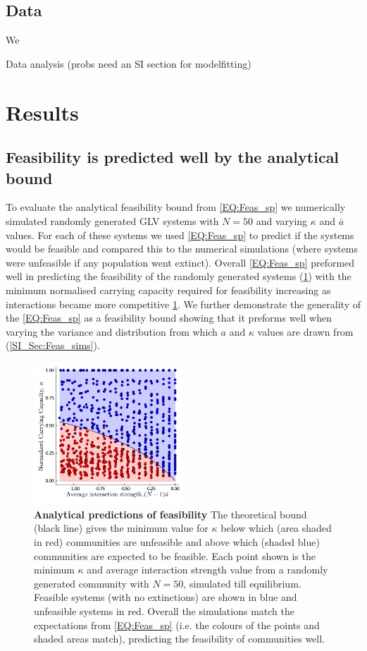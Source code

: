 \documentclass{article}
\begin{document}
\subsection{Data}
We 

Data analysis (probs need an SI section for modelfitting)

\section{Results}

\subsection{Feasibility is predicted well by the analytical bound}

To evaluate the analytical feasibility bound from \cref{EQ:Feas_sp} we numerically simulated randomly generated GLV systems with $N = 50$ and varying $\kappa$ and $\bar{a}$ values. For each of these systems we used \cref{EQ:Feas_sp} to predict if the systems would be feasible and compared this to the numerical simulations (where systems were unfeasible if any population went extinct). Overall \cref{EQ:Feas_sp} preformed well in predicting the feasibility of the randomly generated systems (\cref{Fig:Feasability_Bound}) with the minimum normalised carrying capacity required for feasibility increasing as interactions became more competitive \cref{Fig:Feasability_Bound}. We further demonstrate the generality of the \cref{EQ:Feas_sp} as a feasibility bound showing that it preforms well when varying the variance and distribution from which $a$ and $\kappa$ values are drawn from (\cref{SI_Sec:Feas_sims}). 

\begin{figure}[h] 
    \centering
    \includegraphics[width = 0.5\textwidth]{docs/Figures/Fig_1.pdf}
    \caption[width = \textwidth]{\textbf{Analytical predictions of feasibility} The theoretical bound (black line) gives the minimum value for $\kappa$ below which (area shaded in red) communities are unfeasible and above which (shaded blue) communities are expected to be feasible. Each point shown is the minimum $\kappa$ and average interaction strength value from a randomly generated community with $N=50$, simulated till equilibrium. Feasible systems (with no extinctions) are shown in blue and unfeasible systems in red. Overall the simulations match the expectations from \cref{EQ:Feas_sp} (i.e. the colours of the points and shaded areas match), predicting the feasibility of communities well.}
    \label{Fig:Feasability_Bound}
\end{figure}
\end{document}

